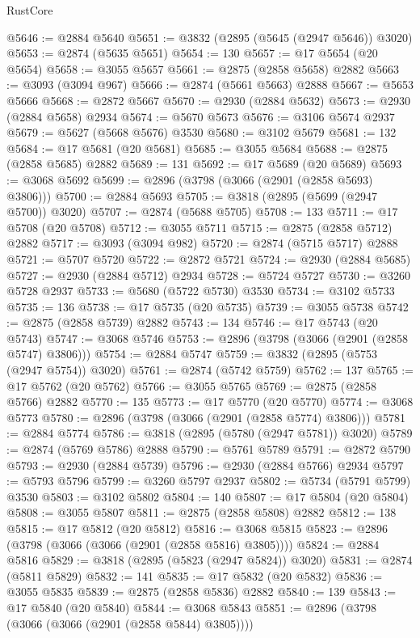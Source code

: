 \begin{lexlean}{RustCore}
\begin{coremodule}
@5646 := @2884 @5640
@5651 := @3832 (@2895 (@5645 (@2947 @5646)) @3020)
@5653 := @2874 (@5635 @5651)
@5654 := 130
@5657 := @17 @5654 (@20 @5654)
@5658 := @3055 @5657
@5661 := @2875 (@2858 @5658) @2882
@5663 := @3093 (@3094 @967)
@5666 := @2874 (@5661 @5663) @2888
@5667 := @5653 @5666
@5668 := @2872 @5667
@5670 := @2930 (@2884 @5632)
@5673 := @2930 (@2884 @5658) @2934
@5674 := @5670 @5673
@5676 := @3106 @5674 @2937
@5679 := @5627 (@5668 @5676) @3530
@5680 := @3102 @5679
@5681 := 132
@5684 := @17 @5681 (@20 @5681)
@5685 := @3055 @5684
@5688 := @2875 (@2858 @5685) @2882
@5689 := 131
@5692 := @17 @5689 (@20 @5689)
@5693 := @3068 @5692
@5699 := @2896 (@3798 (@3066 (@2901 (@2858 @5693) @3806)))
@5700 := @2884 @5693
@5705 := @3818 (@2895 (@5699 (@2947 @5700)) @3020)
@5707 := @2874 (@5688 @5705)
@5708 := 133
@5711 := @17 @5708 (@20 @5708)
@5712 := @3055 @5711
@5715 := @2875 (@2858 @5712) @2882
@5717 := @3093 (@3094 @982)
@5720 := @2874 (@5715 @5717) @2888
@5721 := @5707 @5720
@5722 := @2872 @5721
@5724 := @2930 (@2884 @5685)
@5727 := @2930 (@2884 @5712) @2934
@5728 := @5724 @5727
@5730 := @3260 @5728 @2937
@5733 := @5680 (@5722 @5730) @3530
@5734 := @3102 @5733
@5735 := 136
@5738 := @17 @5735 (@20 @5735)
@5739 := @3055 @5738
@5742 := @2875 (@2858 @5739) @2882
@5743 := 134
@5746 := @17 @5743 (@20 @5743)
@5747 := @3068 @5746
@5753 := @2896 (@3798 (@3066 (@2901 (@2858 @5747) @3806)))
@5754 := @2884 @5747
@5759 := @3832 (@2895 (@5753 (@2947 @5754)) @3020)
@5761 := @2874 (@5742 @5759)
@5762 := 137
@5765 := @17 @5762 (@20 @5762)
@5766 := @3055 @5765
@5769 := @2875 (@2858 @5766) @2882
@5770 := 135
@5773 := @17 @5770 (@20 @5770)
@5774 := @3068 @5773
@5780 := @2896 (@3798 (@3066 (@2901 (@2858 @5774) @3806)))
@5781 := @2884 @5774
@5786 := @3818 (@2895 (@5780 (@2947 @5781)) @3020)
@5789 := @2874 (@5769 @5786) @2888
@5790 := @5761 @5789
@5791 := @2872 @5790
@5793 := @2930 (@2884 @5739)
@5796 := @2930 (@2884 @5766) @2934
@5797 := @5793 @5796
@5799 := @3260 @5797 @2937
@5802 := @5734 (@5791 @5799) @3530
@5803 := @3102 @5802
@5804 := 140
@5807 := @17 @5804 (@20 @5804)
@5808 := @3055 @5807
@5811 := @2875 (@2858 @5808) @2882
@5812 := 138
@5815 := @17 @5812 (@20 @5812)
@5816 := @3068 @5815
@5823 := @2896 (@3798 (@3066 (@3066 (@2901 (@2858 @5816) @3805))))
@5824 := @2884 @5816
@5829 := @3818 (@2895 (@5823 (@2947 @5824)) @3020)
@5831 := @2874 (@5811 @5829)
@5832 := 141
@5835 := @17 @5832 (@20 @5832)
@5836 := @3055 @5835
@5839 := @2875 (@2858 @5836) @2882
@5840 := 139
@5843 := @17 @5840 (@20 @5840)
@5844 := @3068 @5843
@5851 := @2896 (@3798 (@3066 (@3066 (@2901 (@2858 @5844) @3805))))

\end{coremodule}
\end{lexlean}
